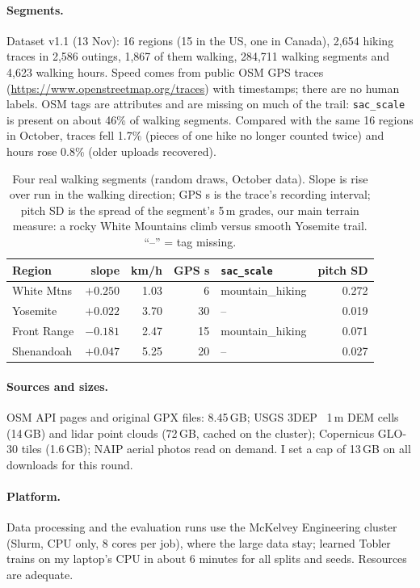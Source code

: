 \documentclass[10pt,twocolumn,letterpaper]{article}
\begin{document}
\paragraph{Segments.} Dataset v1.1 (13 Nov): 16 regions (15 in the US, one in Canada), 2{,}654 hiking traces in 2{,}586 outings, 1{,}867 of them walking, 284{,}711 walking segments and 4{,}623 walking hours. Speed comes from public OSM GPS traces (\url{https://www.openstreetmap.org/traces}) with timestamps; there are no human labels. OSM tags are attributes and are missing on much of the trail: \texttt{sac\_scale} is present on about 46\% of walking segments. Compared with the same 16 regions in October, traces fell 1.7\% (pieces of one hike no longer counted twice) and hours rose 0.8\% (older uploads recovered).

\begin{table}[t]
\centering
\footnotesize
\setlength{\tabcolsep}{2.6pt}
\begin{tabular}{@{}lrrrlr@{}}
\toprule
Region & slope & km/h & GPS s & \texttt{sac\_scale} & pitch SD \\
\midrule
White Mtns & $+0.250$ & 1.03 & 6 & mountain\_hiking & 0.272 \\
Yosemite & $+0.022$ & 3.70 & 30 & -- & 0.019 \\
Front Range & $-0.181$ & 2.47 & 15 & mountain\_hiking & 0.071 \\
Shenandoah & $+0.047$ & 5.25 & 20 & -- & 0.027 \\
\bottomrule
\end{tabular}
\caption{Four real walking segments (random draws, October data). Slope is rise over run in the walking direction; GPS s is the trace's recording interval; pitch SD is the spread of the segment's 5\,m grades, our main terrain measure: a rocky White Mountains climb versus smooth Yosemite trail. ``--'' = tag missing.}
\label{tab:examples}
\end{table}

\paragraph{Sources and sizes.} OSM API pages and original GPX files: 8.45\,GB; USGS 3DEP~\cite{sugarbaker2017status} 1\,m DEM cells (14\,GB) and lidar point clouds (72\,GB, cached on the cluster); Copernicus GLO-30 tiles (1.6\,GB); NAIP aerial photos read on demand. I set a cap of 13\,GB on all downloads for this round.

\paragraph{Platform.} Data processing and the evaluation runs use the McKelvey Engineering cluster (Slurm, CPU only, 8 cores per job), where the large data stay; learned Tobler trains on my laptop's CPU in about 6 minutes for all splits and seeds. Resources are adequate.
\end{document}
